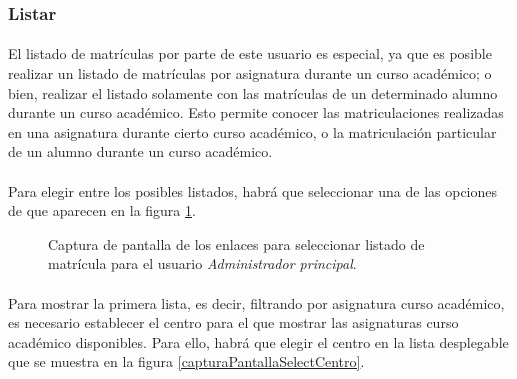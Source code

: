 \subsubsection{Listar}

  \paragraph{}El listado de matrículas por parte de este usuario es especial,
  ya que es posible realizar un listado de matrículas por asignatura durante un
  curso académico; o bien, realizar el listado solamente con las matrículas de
  un determinado alumno durante un curso académico. Esto permite conocer las
  matriculaciones realizadas en una asignatura durante cierto curso académico,
  o la matriculación particular de un alumno durante un curso académico.

  \paragraph{}Para elegir entre los posibles listados, habrá que seleccionar una
  de las opciones de que aparecen en la figura
  \ref{capturaPantallaOpcionesMatricula}.

  \begin{figure}[!ht]
    \begin{center}
      \caption{Captura de pantalla de los enlaces para seleccionar listado de matrícula para el usuario \textit{Administrador principal}.}
      \label{capturaPantallaOpcionesMatricula}
    \end{center}
  \end{figure}

  \paragraph{}Para mostrar la primera lista, es decir, filtrando por asignatura
  curso académico, es necesario establecer el centro para el que mostrar las
  asignaturas curso académico disponibles. Para ello, habrá que elegir el centro
  en la lista desplegable que se muestra en la figura
  \ref{capturaPantallaSelectCentro}.


